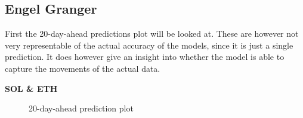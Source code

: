 \subsection{Engel Granger}
First the 20-day-ahead predictions plot will be looked at. These are however not very representable of the actual accuracy of the models, since it is just a single prediction. It does however give an insight into whether the model is able to capture the movements of the actual data.\\
\begin{center}
    \textbf{SOL \& ETH}
\end{center}
\begin{figure}[H]
  \centering
  \quad
  \caption{20-day-ahead prediction plot}
  \label{fig:SOL_ETH_20_DAY_plot}
\end{figure}
